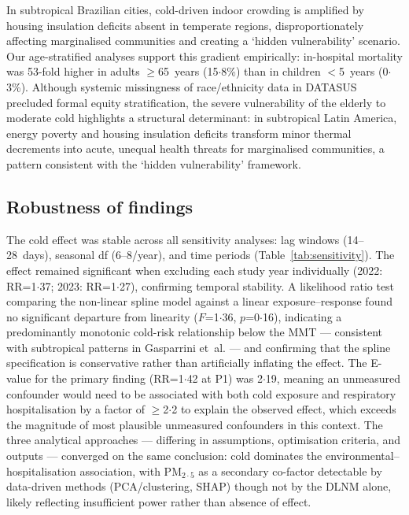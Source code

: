 \documentclass[review,number]{elsarticle}
\begin{document}
In subtropical Brazilian cities, cold-driven indoor crowding is
amplified by housing insulation deficits absent in temperate
regions,\cite{Cheng2024} disproportionately affecting marginalised
communities and creating a `hidden vulnerability'
scenario.\cite{Gasparrini2015,Cohen2017,Zscheischler2020,Gouveia2003} Our
age-stratified analyses support this gradient empirically:
in-hospital mortality was 53-fold higher in adults $\geq$65~years
(15${\cdot}$8\%) than in children $<$5~years (0${\cdot}$3\%).
Although systemic missingness of race/ethnicity data in DATASUS
precluded formal equity stratification, the severe vulnerability of
the elderly to moderate cold highlights a structural determinant: in
subtropical Latin America, energy poverty and housing insulation
deficits transform minor thermal decrements into acute, unequal
health threats for marginalised communities, a pattern consistent
with the `hidden vulnerability' framework.\cite{Cohen2017,Gouveia2003}

\subsection{Robustness of findings}

The cold effect was stable across all sensitivity analyses: lag
windows (14--28~days), seasonal df (6--8/year), and time periods
(Table~\ref{tab:sensitivity}). The effect remained significant when
excluding each study year individually (2022: RR=1${\cdot}$37; 2023:
RR=1${\cdot}$27), confirming temporal stability. A likelihood ratio
test comparing the non-linear spline model against a linear
exposure--response found no significant departure from linearity
($F$=1${\cdot}$36, $p$=0${\cdot}$16), indicating a predominantly
monotonic cold-risk relationship below the MMT --- consistent with
subtropical patterns in Gasparrini
et~al.\cite{Gasparrini2015} --- and confirming that the spline
specification is conservative rather than artificially inflating the
effect. The E-value\cite{VanderWeele2017} for the primary finding
(RR=1${\cdot}$42 at P1) was 2${\cdot}$19, meaning an unmeasured
confounder would need to be associated with both cold exposure and
respiratory hospitalisation by a factor of $\geq$2${\cdot}$2 to
explain the observed effect, which exceeds the magnitude of most
plausible unmeasured confounders in this context. The three analytical approaches --- differing in assumptions,
optimisation criteria, and outputs --- converged on the same
conclusion: cold dominates the environmental--hospitalisation
association, with $\text{PM}_{2{\cdot}5}$ as a secondary co-factor detectable
by data-driven methods (PCA/clustering, SHAP) though not by the DLNM
alone, likely reflecting insufficient power rather than absence of
effect.
\end{document}
